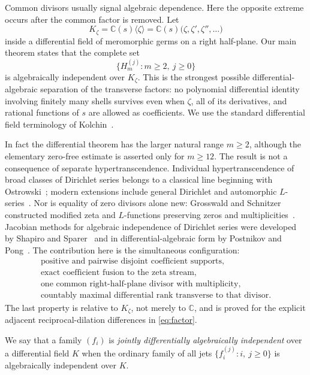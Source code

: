 \documentclass[11pt]{article}
\theoremstyle{definition}
\theoremstyle{remark}
\newcommand{\C}{\mathbb C}
\begin{document}
Common divisors usually signal algebraic dependence.  Here the opposite extreme occurs after
the common factor is removed.  Let
\[
 K_\zeta=\C(s)\langle\zeta\rangle
 =\C(s)\bigl(\zeta,\zeta',\zeta'',\ldots\bigr)
 \tag{1.4}
\]
inside a differential field of meromorphic germs on a right half-plane.  Our main theorem states
that the complete set
\[
 \{H_m^{(j)}:m\geq2,\ j\geq0\}
 \tag{1.5}
\]
is algebraically independent over \(K_\zeta\).  This is the strongest possible
differential-algebraic separation of the transverse factors: no polynomial differential
identity involving finitely many shells survives even when \(\zeta\), all of its derivatives,
and rational functions of \(s\) are allowed as coefficients.  We use the standard differential
field terminology of Kolchin~\cite{Kolchin1973}.

In fact the differential theorem has the larger natural range \(m\geq2\), although the
elementary zero-free estimate is asserted only for \(m\geq12\).  The result is not a consequence
of separate hypertranscendence.  Individual
hypertranscendence of broad classes of Dirichlet series belongs to a classical line beginning
with Ostrowski~\cite{Ostrowski1920}; modern extensions include general Dirichlet and automorphic
\(L\)-series~\cite{Nagoshi2016}.  Nor is equality of zero divisors alone new: Grosswald and
Schnitzer constructed modified zeta and \(L\)-functions preserving zeros and
multiplicities~\cite{GrosswaldSchnitzer1978}.  Jacobian methods for algebraic independence of
Dirichlet series were developed by Shapiro and Sparer~\cite{ShapiroSparer1986} and in
differential-algebraic form by Postnikov and Pong~\cite{Postnikov1949,Pong2016}.  The
contribution here is the simultaneous configuration:
\[
\begin{gathered}
\text{positive and pairwise disjoint coefficient supports},\\
\text{exact coefficient fusion to the zeta stream},\\
\text{one common right-half-plane divisor with multiplicity},\\
\text{countably maximal differential rank transverse to that divisor}.
\end{gathered}
\tag{1.6}
\]
The last property is relative to \(K_\zeta\), not merely to \(\C\), and is proved for the
explicit adjacent reciprocal-dilation differences in \eqref{eq:factor}.

We say that a family \((f_i)\) is \emph{jointly differentially algebraically independent} over a
differential field \(K\) when the ordinary family of all jets
\(\{f_i^{(j)}:i,\ j\geq0\}\) is algebraically independent over \(K\).
\end{document}
